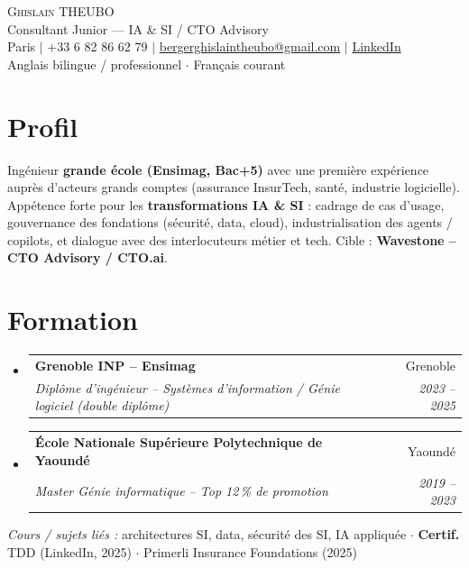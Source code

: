 \documentclass[letterpaper,10.5pt]{article}
\makeatletter
\newcommand{\resumeSubheading}[4]{\vspace{-2pt}\item\begin{tabular*}{0.97\textwidth}[t]{l@{\extracolsep{\fill}}r}\textbf{#1} & #2 \\\textit{\small#3} & \textit{\small #4} \\\end{tabular*}\vspace{-6pt}}
\newcommand{\resumeSubHeadingListStart}{\begin{itemize}[leftmargin=0.12in, label={}]}
\newcommand{\resumeSubHeadingListEnd}{\end{itemize}}
\makeatother
\begin{document}
\begin{center}
{\Huge \scshape Ghislain THEUBO} \\ \vspace{1pt}
{\large Consultant Junior --- IA \& SI / CTO Advisory} \\ \vspace{2pt}
\small Paris $|$ +33 6 82 86 62 79 $|$ \href{mailto:bergerghislaintheubo@gmail.com}{bergerghislaintheubo@gmail.com} $|$ \href{https://www.linkedin.com/in/berger-ghislain}{LinkedIn} \\
Anglais bilingue / professionnel $\cdot$ Fran\c{c}ais courant
\end{center}
\vspace{-8pt}
\section{Profil}
\small{Ing\'enieur \textbf{grande \'ecole (Ensimag, Bac+5)} avec une premi\`ere exp\'erience aupr\`es d'acteurs grands comptes (assurance InsurTech, sant\'e, industrie logicielle). App\'etence forte pour les \textbf{transformations IA \& SI} : cadrage de cas d'usage, gouvernance des fondations (s\'ecurit\'e, data, cloud), industrialisation des agents / copilots, et dialogue avec des interlocuteurs m\'etier et tech. Cible : \textbf{Wavestone -- CTO Advisory / CTO.ai}.}
\vspace{-2pt}
\section{Formation}
\resumeSubHeadingListStart
  \resumeSubheading{Grenoble INP -- Ensimag}{Grenoble}{Dipl\^ome d'ing\'enieur -- Syst\`emes d'information / G\'enie logiciel (double dipl\^ome)}{2023 -- 2025}
  \resumeSubheading{\'Ecole Nationale Sup\'erieure Polytechnique de Yaound\'e}{Yaound\'e}{Master G\'enie informatique -- Top 12\,\% de promotion}{2019 -- 2023}
\resumeSubHeadingListEnd
\vspace{-4pt}
\small{\textit{Cours / sujets li\'es :} architectures SI, data, s\'ecurit\'e des SI, IA appliqu\'ee $\cdot$ \textbf{Certif.} TDD (LinkedIn, 2025) $\cdot$ Primerli Insurance Foundations (2025)}
\end{document}
